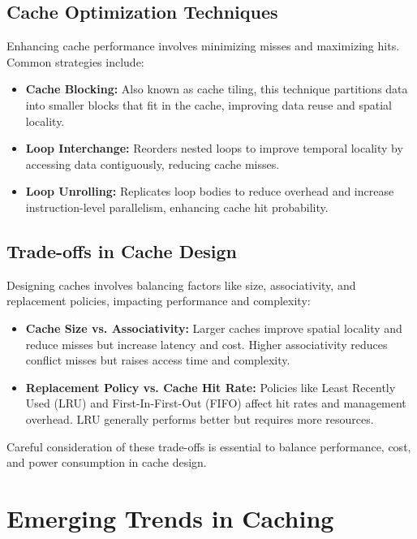 \documentclass[12pt]{book} %
\begin{document}
\subsection{Cache Optimization Techniques}

Enhancing cache performance involves minimizing misses and maximizing hits. Common strategies include:

\begin{itemize}
    \item \textbf{Cache Blocking:} Also known as cache tiling, this technique partitions data into smaller blocks that fit in the cache, improving data reuse and spatial locality.
    
    \item \textbf{Loop Interchange:} Reorders nested loops to improve temporal locality by accessing data contiguously, reducing cache misses.
    
    \item \textbf{Loop Unrolling:} Replicates loop bodies to reduce overhead and increase instruction-level parallelism, enhancing cache hit probability.
\end{itemize}

\subsection{Trade-offs in Cache Design}

Designing caches involves balancing factors like size, associativity, and replacement policies, impacting performance and complexity:

\begin{itemize}
    \item \textbf{Cache Size vs. Associativity:} Larger caches improve spatial locality and reduce misses but increase latency and cost. Higher associativity reduces conflict misses but raises access time and complexity.
    
    \item \textbf{Replacement Policy vs. Cache Hit Rate:} Policies like Least Recently Used (LRU) and First-In-First-Out (FIFO) affect hit rates and management overhead. LRU generally performs better but requires more resources.
\end{itemize}

Careful consideration of these trade-offs is essential to balance performance, cost, and power consumption in cache design.



\section{Emerging Trends in Caching}
\end{document}
